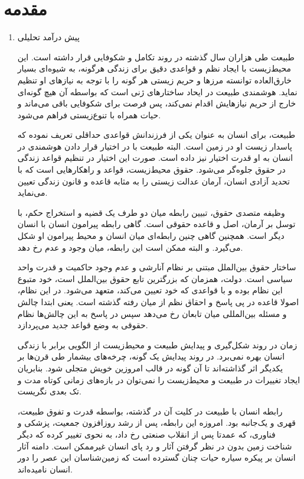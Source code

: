 \clearpage
{}
{}
\chapter*{مقدمه}


\begin{enumerate}
	
	\item پیش درآمد تحلیلی
	
	طبیعت طی هزاران سال گذشته در روند تکامل و شکوفایی قرار داشته است. این محیط‌زیست با ایجاد نظم و قواعدی دقیق برای زندگی هرگونه، به شیوه‌ای بسیار خارق‌العاده توانسته مرز‌ها و حریم زیستی هر گونه را با توجه به  نیاز‌های او تنظیم نماید. هوشمندی طبیعت در ایحاد ساختار‌های ژنی است که بواسطه آن هیچ‌ گونه‌ای خارج از حریم نیاز‌هایش اقدام نمی‌کند، پس فرصت برای شکوفایی باقی می‌ماند و حیات همراه با تنوع‌زیستی فراهم می‌شود. 
	
طبیعت، برای انسان  به عنوان یکی از فرزندانش قواعدی حداقلی تعریف نموده که پاسدار زیست او در زمین است. البته طبیعت با در اختیار قرار دادن هوشمندی در انسان به او قدرت اختیار نیز داده است. صورت این اختیار در تنظیم قواعد زندگی در حقوق جلوه‌گر می‌شود. حقوق محیط‌زیست، قواعد و راهکار‌هایی است که با تحدید  آزادی انسان، آرمان عدالت زیستی را به مثابه قاعده و قانون زندگی تعیین می‌نماید. 

وظیفه متصدی حقوق، تبیین رابطه میان دو طرف یک قضیه و استخراج حکم، با توسل بر آرمان، اصل و قاعده حقوقی است. گاهی رابطه پیرامون انسان با انسان دیگر است. همچنین گاهی چنین رابطه‌ای میان انسان و محیط پیرامون او شکل می‌گیرد. و البته ممکن است این رابطه، میان وجود و عدم رخ دهد. 
	
	ساختار حقوق بین‌الملل مبتنی بر نظام آنارشی و عدم وجود حاکمیت و قدرت واحد سیاسی است. دولت‌، همزمان که بزرگترین تابع حقوق بین‌الملل است، خود متبوع این نظام بوده و با قواعدی که خود تعیین می‌کند، متعهد می‌شود. در این نظام، اصولا قاعده در پی پاسخ و احقاق نظم از میان رفته گذشته است. یعنی ابتدا چالش‌ و مسئله بین‌المللی میان تابعان رخ می‌دهد سپس در پاسخ به این چالش‌ها نظام حقوقی به وضع قواعد جدید می‌پردازد. 
	
	زمان در روند شکل‌گیری و پیدایش طبیعت و محیط‌زیست از الگویی برابر با زندگی انسان بهره نمی‌برد. در روند پیدایش یک گونه، چرخه‌های بیشمار طی قرن‌ها بر یکدیگر اثر گذاشته‌اند تا آن گونه در قالب امروزین خویش متجلی شود. بنابریان ایجاد تغییرات‌ در طبیعت و محیط‌زیست را نمی‌توان در بازه‌های زمانی کوتاه مدت و تک بعدی نگریست. 
	
	رابطه انسان با طبیعت در کلیت آن در گذشته، بواسطه قدرت و تفوق طبیعت، قهری و یک‌جانبه بود. امروزه این رابطه، پس از رشد روز‌افزون جمعیت، پزشکی و فناوری، که عمدتا پس از انقلاب صنعتی رخ داد، به نحوی تغییر کرده که دیگر شناخت زمین بدون در نظر گرفتن آثار و رد پای انسان غیرممکن است. دامنه آثار انسان بر پیکره سیاره حیات چنان گسترده است که زمین‌شناسان این عصر را دور انسان نامیده‌اند. 
	

\end{enumerate}
